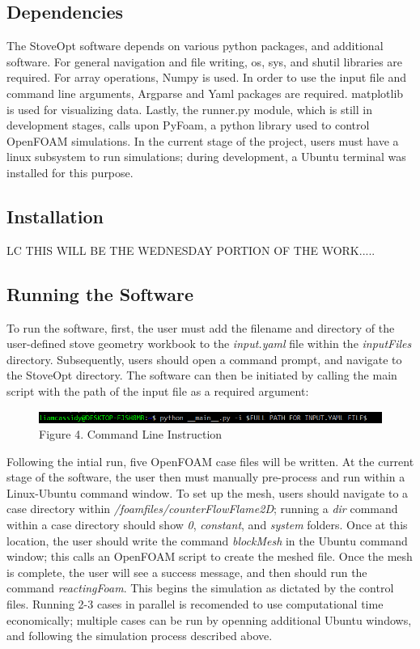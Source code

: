 \documentclass[3p,times,twocolumn]{elsarticle}
\begin{document}
\subsection{Dependencies}
The StoveOpt software depends on various python packages, and additional software. For general navigation and file writing, os, sys, and shutil libraries are required. For array operations, Numpy is used. In order to use the input file and command line arguments, Argparse and Yaml packages are required. matplotlib is used for visualizing data. Lastly, the runner.py module, which is still in development stages, calls upon PyFoam, a python library used to control OpenFOAM simulations. In the current stage of the project, users must have a linux subsystem to run simulations; during development, a Ubuntu terminal was installed for this purpose.



\subsection{Installation}

LC THIS WILL BE THE WEDNESDAY PORTION OF THE WORK.....

\subsection{Running the Software}
To run the software, first, the user must add the filename and directory of the user-defined stove geometry workbook to the \textit{input.yaml} file within the \textit{inputFiles} directory. Subsequently, users should open a command prompt, and navigate to the StoveOpt directory. The software can then be initiated by calling the main script with the path of the input file as a required argument:

\begin{figure}{\linewidth}
	\includegraphics[width=\linewidth]{commandline.PNG}
	\caption{Figure 4. Command Line Instruction}
\end{figure}


Following the intial run, five OpenFOAM case files will be written. At the current stage of the software, the user then must manually pre-process and run within a Linux-Ubuntu command window. To set up the mesh, users should navigate to a case directory within \textit{/foamfiles/counterFlowFlame2D}; running a \textit{dir} command within a case directory should show \textit{0}, \textit{constant}, and \textit{system} folders. Once at this location, the user should write the command \textit{blockMesh} in the Ubuntu command window; this calls an OpenFOAM script to create the meshed file. Once the mesh is complete, the user will see a success message, and then should run the command \textit{reactingFoam}. This begins the simulation as dictated by the control files. Running 2-3 cases in parallel is recomended to use computational time economically; multiple cases can be run by openning additional Ubuntu windows, and following the simulation process described above. 
\end{document}
